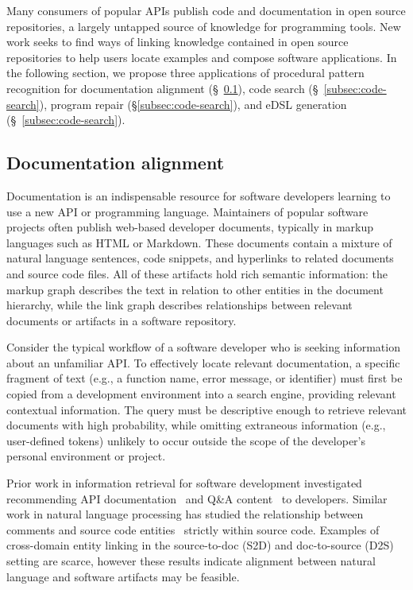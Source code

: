 \documentclass[10pt]{article}
\begin{document}
Many consumers of popular APIs publish code and documentation in open source repositories, a largely untapped source of knowledge for programming tools. New work seeks to find ways of linking knowledge contained in open source repositories to help users locate examples and compose software applications. In the following section, we propose three applications of procedural pattern recognition for documentation alignment (\S~\ref{subsec:tracelink}), code search (\S~\ref{subsec:code-search}), program repair (\S\ref{subsec:code-search}), and eDSL generation (\S~\ref{subsec:code-search}).

\pagebreak\subsection{Documentation alignment}\label{subsec:tracelink}

Documentation is an indispensable resource for software developers learning to use a new API or programming language. Maintainers of popular software projects often publish web-based developer documents, typically in markup languages such as HTML or Markdown. These documents contain a mixture of natural language sentences, code snippets, and hyperlinks to related documents and source code files. All of these artifacts hold rich semantic information: the markup graph describes the text in relation to other entities in the document hierarchy, while the link graph describes relationships between relevant documents or artifacts in a software repository.

Consider the typical workflow of a software developer who is seeking information about an unfamiliar API. To effectively locate relevant documentation, a specific fragment of text (e.g., a function name, error message, or identifier) must first be copied from a development environment into a search engine, providing relevant contextual information. The query must be descriptive enough to retrieve relevant documents with high probability, while omitting extraneous information (e.g., user-defined tokens) unlikely to occur outside the scope of the developer's personal environment or project.

Prior work in information retrieval for software development investigated recommending API documentation~\cite{robillard2015recommending} and Q\&A content~\cite{treude2016augmenting} to developers. Similar work in natural language processing has studied the relationship between comments and source code entities~\cite{iyer2018mapping, panthaplackel2020associating} strictly within source code. Examples of cross-domain entity linking in the source-to-doc (S2D) and doc-to-source (D2S) setting are scarce, however these results indicate alignment between natural language and software artifacts may be feasible.
\end{document}
